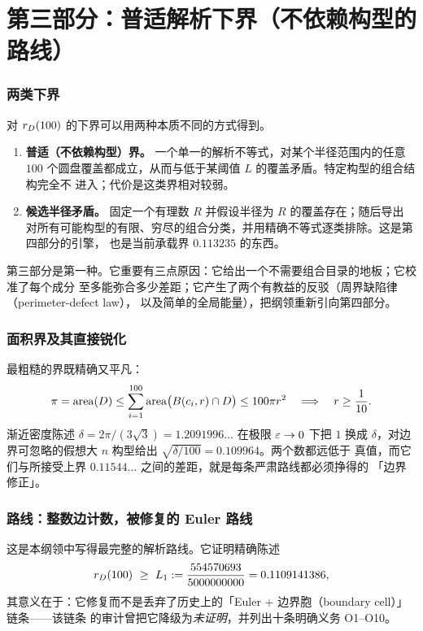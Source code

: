 \part*{第三部分：普适解析下界（不依赖构型的路线）}
\setcounter{section}{0}

\section{两类下界}

对 $r_{D}(100)$ 的下界可以用两种本质不同的方式得到。

\begin{enumerate}[leftmargin=1.6em,itemsep=3pt]
\item \textbf{普适（不依赖构型）界。} 一个单一的解析不等式，对某个半径范围内的任意
$100$ 个圆盘覆盖都成立，从而与低于某阈值 $L$ 的覆盖矛盾。特定构型的组合结构完全不
进入；代价是这类界相对较弱。
\item \textbf{候选半径矛盾。} 固定一个有理数 $R$ 并假设半径为 $R$ 的覆盖存在；随后导出
对所有可能构型的有限、穷尽的组合分类，并用精确不等式逐类排除。这是第四部分的引擎，
也是当前承载界 $0.113235$ 的东西。
\end{enumerate}

第三部分是第一种。它重要有三点原因：它给出一个不需要组合目录的地板；它校准了每个成分
至多能弥合多少差距；它产生了两个有教益的反驳（周界缺陷律（perimeter-defect law），
以及简单的全局能量），把纲领重新引向第四部分。

\section{面积界及其直接锐化}

最粗糙的界既精确又平凡：
\[
\pi=\operatorname{area}(D)\le\sum_{i=1}^{100}\operatorname{area}\bigl(B(c_i,r)\cap D\bigr)\le100\pi r^2
\quad\Longrightarrow\quad r\ge\frac1{10}.
\]
渐近密度陈述 $\delta=2\pi/(3\sqrt3)=1.2091996\ldots$ 在极限 $\varepsilon\to0$ 下把 $1$ 换成
$\delta$，对边界可忽略的假想大 $n$ 构型给出 $\sqrt{\delta/100}=0.109964$。两个数都远低于
真值，而它们与所接受上界 $0.11544\ldots$ 之间的差距，就是每条严肃路线都必须挣得的
「边界修正」。

\section{路线：整数边计数，被修复的 Euler 路线}
\label{sec:integer-edge}

这是本纲领中写得最完整的解析路线。它证明精确陈述
\[
\rD(100)\ \ge\ L_1:=\frac{554570693}{5000000000}=0.1109141386 ,
\]
其意义在于：它修复而不是丢弃了历史上的「Euler + 边界胞（boundary cell）」链条——该链条
的审计曾把它降级为\emph{未证明}，并列出十条明确义务 O1--O10。

